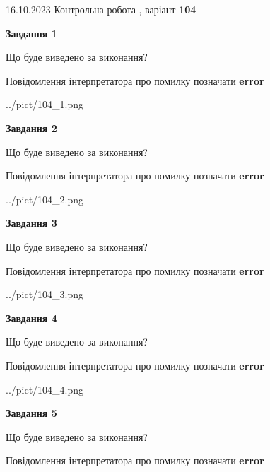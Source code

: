 \documentclass[12pt, ukrainian]{article}
\begin{document}
{\Large{16.10.2023 Контрольна робота , варіант  \No \textbf { 104 }\par}}
{
\begin {large}
{\begin {center}\textbf{Завдання 1}\end {center}}\par
Що буде виведено за виконання? \par
Повідомлення інтерпретатора про помилку позначати \textbf{error}

\begin{center}
	{../pict/104_1.png}
\end{center}
\newpage

{\begin {center}\textbf{Завдання 2}\end {center}}\par
Що буде виведено за виконання? \par
Повідомлення інтерпретатора про помилку позначати \textbf{error}

\begin{center}
	{../pict/104_2.png}
\end{center}
\newpage

{\begin {center}\textbf{Завдання 3}\end {center}}\par
Що буде виведено за виконання? \par
Повідомлення інтерпретатора про помилку позначати \textbf{error}

\begin{center}
	{../pict/104_3.png}
\end{center}
\newpage

{\begin {center}\textbf{Завдання 4}\end {center}}\par
Що буде виведено за виконання? \par
Повідомлення інтерпретатора про помилку позначати \textbf{error}

\begin{center}
	{../pict/104_4.png}
\end{center}
\newpage

{\begin {center}\textbf{Завдання 5}\end {center}}\par
Що буде виведено за виконання? \par
Повідомлення інтерпретатора про помилку позначати \textbf{error}


\end{large}}
\end{document}
